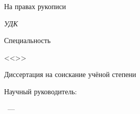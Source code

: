 \thispagestyle{empty}

\begin{center}
\thesisOrganization \par
\par
\end{center}

\vspace{10mm}
\begin{flushright}
На правах рукописи

{\sl УДК \thesisUdk}
\end{flushright}

\vspace{10mm}
\begin{center}
{\large \thesisAuthor}
\end{center}

\vspace{5mm}
\begin{center}
{\bf \large \thesisTitle
\par}

\vspace{10mm}
{%
Специальность \thesisSpecialtyNumber

<<\thesisSpecialtyTitle>>
}

\vspace{10mm}
Диссертация на соискание учёной степени

\thesisDegree
\end{center}

\vspace{10mm}
\begin{flushright}
Научный руководитель:

\supervisorRegalia

\supervisorFio

\end{flushright}

\vspace{20mm}
\begin{center}
{\thesisCity~--- \thesisYear}
\end{center}

\newpage
